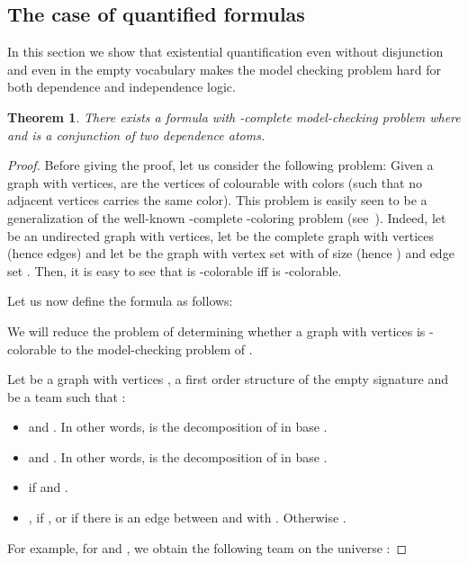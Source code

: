 \documentclass{article}
\theoremstyle{plain}
\newtheorem{theorem}{Theorem}
\theoremstyle{definition}
\begin{document}
\subsection{The case of quantified formulas}

In this section we show that  existential quantification even without disjunction and even in the empty vocabulary makes the model checking problem hard  for both dependence and independence logic. 


\begin{theorem}\label{Exists+wedge} 
There exists a formula  with -complete model-checking problem where  and  is a conjunction of two dependence atoms.



\end{theorem}

\begin{proof}
Before giving the proof, let us consider the following problem: Given  a graph  with   vertices, are the vertices of  colourable with  colors (such that no adjacent vertices carries the same color). This problem is easily seen to be a generalization of the well-known -complete -coloring problem (see~\cite{GareyJ1979}). Indeed, let  be an undirected graph with  vertices, let  be the complete graph with  vertices (hence  edges) and let  be the graph with vertex set  with  of size  (hence ) and edge set . Then, it is easy to see that  is -colorable iff  is  
	-colorable.   


Let us now define  the formula  as follows:
	 
	We will reduce the problem of determining whether a graph  with   vertices is -colorable to the model-checking problem of . 

	Let  be a graph with  vertices ,  a first order structure of the empty signature and  be a team such that :

	\begin{itemize}
		\item  and . In other words,  is the decomposition of  in base .
		\item  and . In other words,  is the decomposition of   in base .
		
		\item  if  and .\item , if , or if there is an edge between  and  with . Otherwise .
	\end{itemize}
	
	For example, for  and , we  obtain the following team on the universe :
	

\end{proof}
\end{document}
